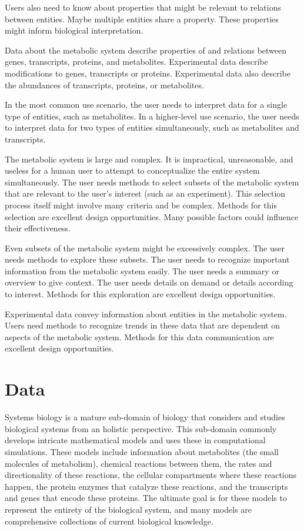 Users also need to know about properties that might be relevant to relations between entities.
Maybe multiple entities share a property.
These properties might inform biological interpretation.

Data about the metabolic system describe properties of and relations between genes, transcripts, proteins, and metabolites.
Experimental data describe modifications to genes, transcripts or proteins.
Experimental data also describe the abundances of transcripts, proteins, or metabolites.

In the most common use scenario, the user needs to interpret data for a single type of entities, such as metabolites.
In a higher-level use scenario, the user needs to interpret data for two types of entities simultaneously, such as metabolites and transcripts.

The metabolic system is large and complex.
It is impractical, unreasonable, and useless for a human user to attempt to conceptualize the entire system simultaneously.
The user needs methods to select subsets of the metabolic system that are relevant to the user's interest (such as an experiment).
This selection process itself might involve many criteria and be complex.
Methods for this selection are excellent design opportunities.
Many possible factors could influence their effectiveness.

Even subsets of the metabolic system might be excessively complex.
The user needs methods to explore these subsets.
The user needs to recognize important information from the metabolic system easily.
The user needs a summary or overview to give context.
The user needs details on demand or details according to interest.
Methods for this exploration are excellent design opportunities.

Experimental data convey information about entities in the metabolic system.
Users need methods to recognize trends in these data that are dependent on aspects of the metabolic system.
Methods for this data communication are excellent design opportunities.

\section{Data}

Systems biology is a mature sub-domain of biology that considers and studies biological systems from an holistic perspective.
This sub-domain commonly develops intricate mathematical models and uses these in computational simulations.
These models include information about metabolites (the small molecules of metabolism), chemical reactions between them, the rates and directionality of these reactions, the cellular compartments where these reactions happen, the protein enzymes that catalyze these reactions, and the transcripts and genes that encode these proteins.
The ultimate goal is for these models to represent the entirety of the biological system, and many models are comprehensive collections of current biological knowledge.

